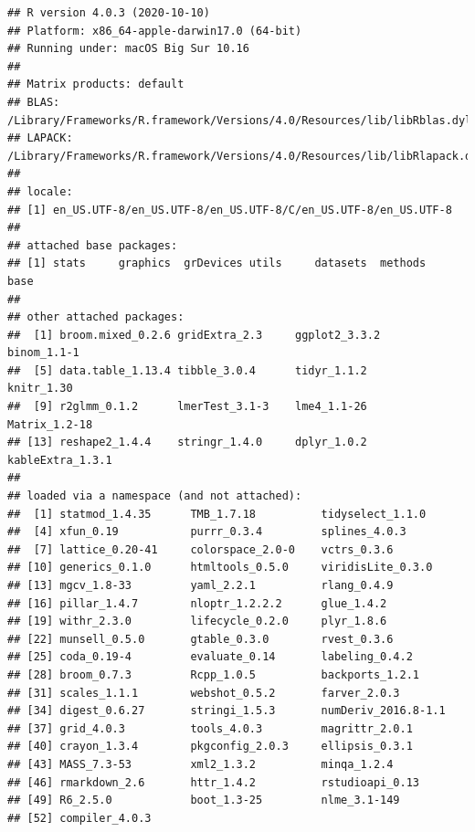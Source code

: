 \documentclass[
]{article}
\begin{document}
\begin{verbatim}
## R version 4.0.3 (2020-10-10)
## Platform: x86_64-apple-darwin17.0 (64-bit)
## Running under: macOS Big Sur 10.16
## 
## Matrix products: default
## BLAS:   /Library/Frameworks/R.framework/Versions/4.0/Resources/lib/libRblas.dylib
## LAPACK: /Library/Frameworks/R.framework/Versions/4.0/Resources/lib/libRlapack.dylib
## 
## locale:
## [1] en_US.UTF-8/en_US.UTF-8/en_US.UTF-8/C/en_US.UTF-8/en_US.UTF-8
## 
## attached base packages:
## [1] stats     graphics  grDevices utils     datasets  methods   base     
## 
## other attached packages:
##  [1] broom.mixed_0.2.6 gridExtra_2.3     ggplot2_3.3.2     binom_1.1-1      
##  [5] data.table_1.13.4 tibble_3.0.4      tidyr_1.1.2       knitr_1.30       
##  [9] r2glmm_0.1.2      lmerTest_3.1-3    lme4_1.1-26       Matrix_1.2-18    
## [13] reshape2_1.4.4    stringr_1.4.0     dplyr_1.0.2       kableExtra_1.3.1 
## 
## loaded via a namespace (and not attached):
##  [1] statmod_1.4.35      TMB_1.7.18          tidyselect_1.1.0   
##  [4] xfun_0.19           purrr_0.3.4         splines_4.0.3      
##  [7] lattice_0.20-41     colorspace_2.0-0    vctrs_0.3.6        
## [10] generics_0.1.0      htmltools_0.5.0     viridisLite_0.3.0  
## [13] mgcv_1.8-33         yaml_2.2.1          rlang_0.4.9        
## [16] pillar_1.4.7        nloptr_1.2.2.2      glue_1.4.2         
## [19] withr_2.3.0         lifecycle_0.2.0     plyr_1.8.6         
## [22] munsell_0.5.0       gtable_0.3.0        rvest_0.3.6        
## [25] coda_0.19-4         evaluate_0.14       labeling_0.4.2     
## [28] broom_0.7.3         Rcpp_1.0.5          backports_1.2.1    
## [31] scales_1.1.1        webshot_0.5.2       farver_2.0.3       
## [34] digest_0.6.27       stringi_1.5.3       numDeriv_2016.8-1.1
## [37] grid_4.0.3          tools_4.0.3         magrittr_2.0.1     
## [40] crayon_1.3.4        pkgconfig_2.0.3     ellipsis_0.3.1     
## [43] MASS_7.3-53         xml2_1.3.2          minqa_1.2.4        
## [46] rmarkdown_2.6       httr_1.4.2          rstudioapi_0.13    
## [49] R6_2.5.0            boot_1.3-25         nlme_3.1-149       
## [52] compiler_4.0.3
\end{verbatim}
\end{document}
